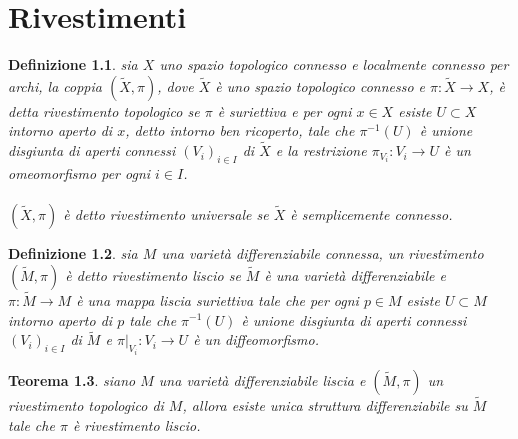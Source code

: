 \documentclass[oneside, 11pt]{amsbook}
\newcommand{\co}[1]{\textit{#1}}
\newcommand{\wtM}{\widetilde{M}}
\newcommand{\wtX}{\widetilde{X}}
\newcommand{\0}{{(0)}}
\newcommand{\3}{{(3)}}
\theoremstyle{colonplain}
\newtheorem{thm}{Teorema}[chapter]
\theoremstyle{colondefinition}
\newtheorem{defn}[thm]{Definizione}
\theoremstyle{colonremark}
\numberwithin{equation}{chapter}
\begin{document}
\chapter{Rivestimenti}
\begin{defn}
    sia $X$ uno spazio topologico connesso e localmente connesso per archi, la coppia $(\wtX, \pi)$, dove $\wtX$ è uno spazio topologico connesso e $\pi : \wtX \longrightarrow X$, è detta \co{rivestimento topologico} se $\pi$ è suriettiva e per ogni $x \in X$ esiste $U \subset X$ intorno aperto di $x$, detto \co{intorno ben ricoperto}, tale che $\pi^{-1}(U)$ è unione disgiunta di aperti connessi $(V_i)_{i \in I}$ di $\wtX$ e la restrizione $\pi_{V_i} : V_i \longrightarrow U$ è un omeomorfismo per ogni $i \in I$. \\ \\
    $(\wtX, \pi)$ è detto \co{rivestimento universale} se $\wtX$ è semplicemente connesso.
\end{defn}
\begin{defn}
    sia $M$ una varietà differenziabile connessa, un rivestimento $(\wtM, \pi)$ è detto \co{rivestimento liscio} se $\wtM$ è una varietà differenziabile e $\pi : \wtM \longrightarrow M$ è una mappa liscia suriettiva tale che per ogni $p \in M$ esiste $U \subset M$ intorno aperto di $p$ tale che $\pi^{-1}(U)$ è unione disgiunta di aperti connessi $(V_i)_{i \in I}$ di $\wtM$ e $\pi|_{V_i} : V_i \longrightarrow U$ è un diffeomorfismo.
\end{defn}
\begin{thm}
    siano $M$ una varietà differenziabile liscia e $(\wtM, \pi)$ un rivestimento topologico di $M$, allora esiste unica struttura differenziabile su $\wtM$ tale che $\pi$ è rivestimento liscio.
\end{thm}
\end{document}
